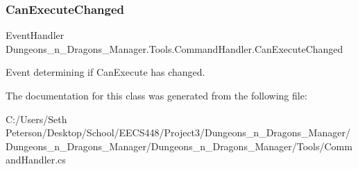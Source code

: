 \subsubsection{\texorpdfstring{Can\+Execute\+Changed}{CanExecuteChanged}}
{\footnotesize\ttfamily Event\+Handler Dungeons\+\_\+n\+\_\+\+Dragons\+\_\+\+Manager.\+Tools.\+Command\+Handler.\+Can\+Execute\+Changed}



Event determining if Can\+Execute has changed. 



The documentation for this class was generated from the following file\+:\begin{DoxyCompactItemize}
\item 
C\+:/\+Users/\+Seth Peterson/\+Desktop/\+School/\+E\+E\+C\+S448/\+Project3/\+Dungeons\+\_\+n\+\_\+\+Dragons\+\_\+\+Manager/\+Dungeons\+\_\+n\+\_\+\+Dragons\+\_\+\+Manager/\+Dungeons\+\_\+n\+\_\+\+Dragons\+\_\+\+Manager/\+Tools/Command\+Handler.\+cs\end{DoxyCompactItemize}
